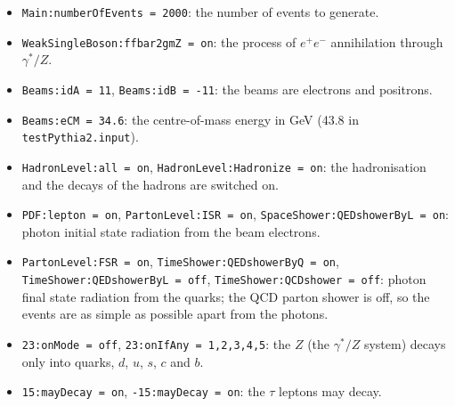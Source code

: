 
\begin{itemize}
\item \texttt{Main:numberOfEvents = 2000}: the number of events to generate.
\item \texttt{WeakSingleBoson:ffbar2gmZ = on}: the process of $e^+e^-$ annihilation through $\gamma^*/Z$.
\item \texttt{Beams:idA = 11}, \texttt{Beams:idB = -11}: the beams are electrons and positrons.
\item \texttt{Beams:eCM = 34.6}: the centre-of-mass energy in GeV (43.8 in \texttt{testPythia2.input}).
\item \texttt{HadronLevel:all = on}, \texttt{HadronLevel:Hadronize = on}: the hadronisation and the decays of the hadrons are switched on.
\item \texttt{PDF:lepton = on}, \texttt{PartonLevel:ISR = on}, \texttt{SpaceShower:QEDshowerByL = on}: photon initial state radiation from the beam electrons.
\item \texttt{PartonLevel:FSR = on}, \texttt{TimeShower:QEDshowerByQ = on}, \texttt{TimeShower:QEDshowerByL = off}, \texttt{TimeShower:QCDshower = off}: photon final state radiation from the quarks; the QCD parton shower is off, so the events are as simple as possible apart from the photons.
\item \texttt{23:onMode = off}, \texttt{23:onIfAny = 1,2,3,4,5}: the $Z$ (the $\gamma^*/Z$ system) decays only into quarks, $d$, $u$, $s$, $c$ and $b$.
\item \texttt{15:mayDecay = on}, \texttt{-15:mayDecay = on}: the $\tau$ leptons may decay.
\end{itemize}

